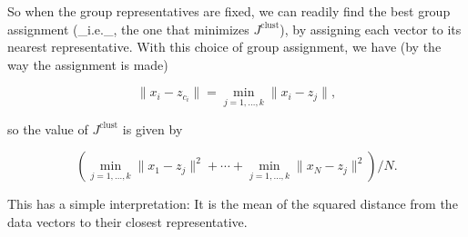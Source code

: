 So when the group representatives are fixed, we can readily find the best group assignment (_i.e._, the one that minimizes \(J^{\mathrm{clust}}\)), by assigning each vector to its nearest representative. With this choice of group assignment, we have (by the way the assignment is made)

\[\|x_{i}-z_{c_{i}}\|=\min_{j=1,\ldots,k}\|x_{i}-z_{j}\|,\]

so the value of \(J^{\mathrm{clust}}\) is given by

\[\left(\min_{j=1,\ldots,k}\|x_{1}-z_{j}\|^{2}+\cdots+\min_{j=1,\ldots,k}\|x_{N }-z_{j}\|^{2}\right)/N.\]

This has a simple interpretation: It is the mean of the squared distance from the data vectors to their closest representative.

 